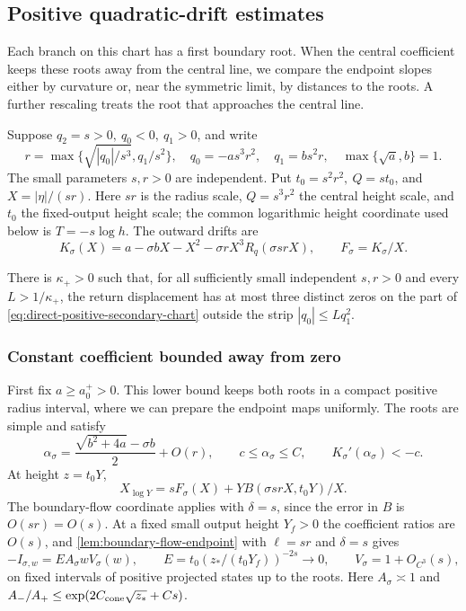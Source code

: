 \subsection{Positive quadratic-drift estimates}
\label{sec:direct-positive-quadratic}

Each branch on this chart has a first boundary root. When the central
coefficient keeps these roots away from the central line, we compare
the endpoint slopes either by curvature or, near the symmetric limit,
by distances to the roots. A further rescaling treats the root that
approaches the central line.

Suppose
\(q_2=s>0,\ q_0<0,\ q_1>0\), and write
\begin{equation}
\label{eq:direct-positive-secondary-chart}
 r=\max\{\sqrt{|q_0|/s^3},q_1/s^2\},\quad
 q_0=-as^3r^2,\quad q_1=bs^2r,\quad
 \max\{\sqrt a,b\}=1 .
\end{equation}
The small parameters \(s,r>0\) are independent. Put
\(t_0=s^2r^2,\ Q=st_0\), and \(X=|\eta|/(sr)\).
Here \(sr\) is the radius scale, \(Q=s^3r^2\) the central
height scale, and \(t_0\) the fixed-output height scale;
the common logarithmic height coordinate used below is \(T=-s\log h\).
The outward drifts are
\begin{equation}
\label{eq:direct-positive-secondary-drifts}
 K_\sigma(X)=a-\sigma bX-X^2
                 -\sigma rX^3R_q(\sigma srX),\qquad
 F_\sigma=K_\sigma/X .
\end{equation}
\begin{proposition}
\label{prop:direct-positive-quadratic}
There is \(\kappa_+>0\) such that, for all sufficiently small
independent \(s,r>0\) and every \(L>1/\kappa_+\), the return
displacement has at most three distinct zeros on the part of
\eqref{eq:direct-positive-secondary-chart} outside the strip
\(|q_0|\le Lq_1^2\).
\end{proposition}

\subsubsection{Constant coefficient bounded away from zero}

First fix \(a\ge a_0^+>0\). This lower bound keeps both roots in a
compact positive radius interval, where we can prepare the endpoint
maps uniformly. The roots are simple and satisfy
\[
 \alpha_\sigma
 =\frac{\sqrt{b^2+4a}-\sigma b}{2}+O(r),\qquad
 c\le\alpha_\sigma\le C,\qquad
 K_\sigma'(\alpha_\sigma)<-c .
\]
At height \(z=t_0Y\),
\[
 X_{\log Y}=sF_\sigma(X)+YB(\sigma srX,t_0Y)/X .
\]
The boundary-flow coordinate applies with \(\delta=s\),
since the error in \(B\) is \(O(sr)=O(s)\).
At a fixed small output height \(Y_f>0\) the coefficient ratios
are \(O(s)\), and \cref{lem:boundary-flow-endpoint} with
\(\ell=sr\) and \(\delta=s\) gives
\begin{equation}
\label{eq:direct-positive-secondary-endpoints}
 -I_{\sigma,w}=EA_\sigma wV_\sigma(w),\qquad
 E=t_0(z_*/(t_0Y_f))^{-2s}\to0,\qquad
 V_\sigma=1+O_{C^3}(s),
\end{equation}
on fixed intervals of positive projected states up to the roots.
Here \(A_\sigma\asymp1\) and
\(A_-/A_+\le\exp(2C_{\rm cone}\sqrt{z_*}+Cs)\).

